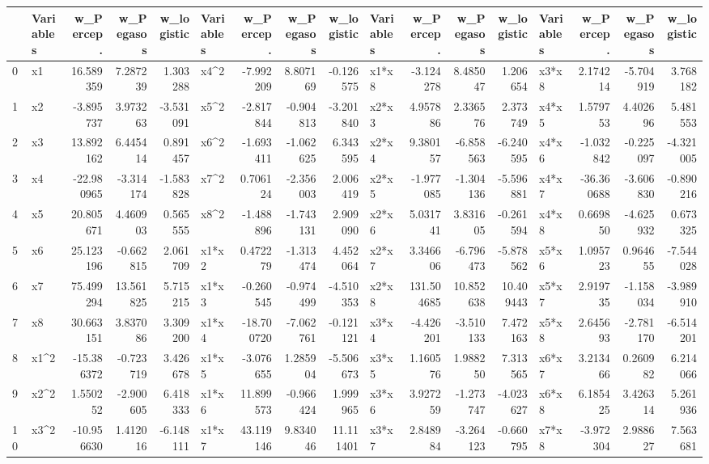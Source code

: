 \begin{tabular}{llrrrlrrrlrrrlrrr}
\toprule
 & Variables & w_Percep. & w_Pegasos & w_logistic & Variables & w_Percep. & w_Pegasos & w_logistic & Variables & w_Percep. & w_Pegasos & w_logistic & Variables & w_Percep. & w_Pegasos & w_logistic \\
\midrule
0 & x1 & 16.589359 & 7.287239 & 1.303288 & x4^2 & -7.992209 & 8.807169 & -0.126575 & x1*x8 & -3.124278 & 8.485047 & 1.206654 & x3*x8 & 2.174214 & -5.704919 & 3.768182 \\
1 & x2 & -3.895737 & 3.973263 & -3.531091 & x5^2 & -2.817844 & -0.904813 & -3.201840 & x2*x3 & 4.957886 & 2.336576 & 2.373749 & x4*x5 & 1.579753 & 4.402696 & 5.481553 \\
2 & x3 & 13.892162 & 6.445414 & 0.891457 & x6^2 & -1.693411 & -1.062625 & 6.343595 & x2*x4 & 9.380157 & -6.858563 & -6.240595 & x4*x6 & -1.032842 & -0.225097 & -4.321005 \\
3 & x4 & -22.980965 & -3.314174 & -1.583828 & x7^2 & 0.706124 & -2.356003 & 2.006419 & x2*x5 & -1.977085 & -1.304136 & -5.596881 & x4*x7 & -36.360688 & -3.606830 & -0.890216 \\
4 & x5 & 20.805671 & 4.460903 & 0.565555 & x8^2 & -1.488896 & -1.743131 & 2.909090 & x2*x6 & 5.031741 & 3.831605 & -0.261594 & x4*x8 & 0.669850 & -4.625932 & 0.673325 \\
5 & x6 & 25.123196 & -0.662815 & 2.061709 & x1*x2 & 0.472279 & -1.313474 & 4.452064 & x2*x7 & 3.346606 & -6.796473 & -5.878562 & x5*x6 & 1.095723 & 0.964655 & -7.544028 \\
6 & x7 & 75.499294 & 13.561825 & 5.715215 & x1*x3 & -0.260545 & -0.974499 & -4.510353 & x2*x8 & 131.504685 & 10.852638 & 10.409443 & x5*x7 & 2.919735 & -1.158034 & -3.989910 \\
7 & x8 & 30.663151 & 3.837086 & 3.309200 & x1*x4 & -18.700720 & -7.062761 & -0.121121 & x3*x4 & -4.426201 & -3.510133 & 7.472163 & x5*x8 & 2.645693 & -2.781170 & -6.514201 \\
8 & x1^2 & -15.386372 & -0.723719 & 3.426678 & x1*x5 & -3.076655 & 1.285904 & -5.506673 & x3*x5 & 1.160576 & 1.988250 & 7.313565 & x6*x7 & 3.213466 & 0.260982 & 6.214066 \\
9 & x2^2 & 1.550252 & -2.900605 & 6.418333 & x1*x6 & 11.899573 & -0.966424 & 1.999965 & x3*x6 & 3.927259 & -1.273747 & -4.023627 & x6*x8 & 6.185425 & 3.426314 & 5.261936 \\
10 & x3^2 & -10.956630 & 1.412016 & -6.148111 & x1*x7 & 43.119146 & 9.834046 & 11.111401 & x3*x7 & 2.848984 & -3.264123 & -0.660795 & x7*x8 & -3.972304 & 2.988627 & 7.563681 \\
\bottomrule
\end{tabular}
